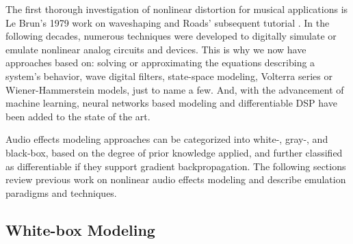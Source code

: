 The first thorough investigation of nonlinear distortion for musical applications is Le Brun's 1979 work on waveshaping \citep{le1979digital} and Roads' subsequent tutorial \citep{roads1979tutorial}.
In the following decades, numerous techniques were developed to digitally simulate or emulate nonlinear analog circuits and devices.
This is why we now have approaches based on: 
solving or approximating the equations describing a system's behavior, 
wave digital filters, 
state-space modeling, 
Volterra series 
or Wiener-Hammerstein models, 
just to name a few.
And, with the advancement of machine learning, neural networks based modeling 
and differentiable DSP 
have been added to the state of the art.

Audio effects modeling approaches can be categorized into white-, gray-, and black-box, based on the degree of prior knowledge applied, and further classified as differentiable if they support gradient backpropagation.
The following sections review previous work on nonlinear audio effects modeling and describe emulation paradigms and techniques.

\subsection{White-box Modeling}
\label{sec:back-white-box}

